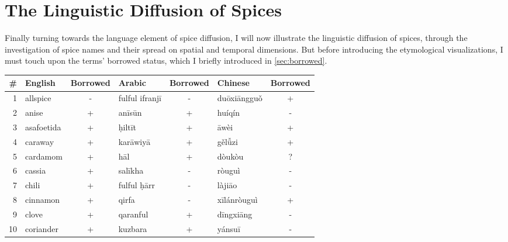 \section{The Linguistic Diffusion of Spices}

Finally turning towards the language element of spice diffusion, I will now illustrate the linguistic diffusion of spices, through the investigation of spice names and their spread on spatial and temporal dimensions. But before introducing the etymological visualizations, I must touch upon the terms' borrowed status, which I briefly introduced in \cref{sec:borrowed}. 


\begin{table}[h]
    \begin{tabular}{@{}rlclclc@{}}
    \toprule
    \textbf{\#} & \textbf{English} & \textbf{Borrowed} & \textbf{Arabic}  & \textbf{Borrowed} & \textbf{Chinese} & \textbf{Borrowed} \\ \midrule
    1           & allspice         & -           & fulful ifranjī   & -           & duōxiāngguǒ      & +           \\
    2           & anise            & +           & anīsūn           & +           & huíqín           & -           \\
    3           & asafoetida       & +           & ḥiltīt           & +           & āwèi             & +           \\
    4           & caraway          & +           & karāwiyā         & +           & gělǚzi         & +           \\
    5           & cardamom         & +           & hāl              & +           & dòukòu           & ?           \\
    6           & cassia           & +           & salīkha          & -           & ròuguì           & -           \\
    7           & chili            & +           & fulful ḥārr      & -           & làjiāo           & -           \\
    8           & cinnamon         & +           & qirfa            & -           & xīlánròuguì      & +           \\
    9           & clove            & +           & qaranful         & +           & dīngxiāng        & -           \\
    10          & coriander        & +           & kuzbara          & +           & yánsuī           & -           \\

\end{tabular}
\end{table}
